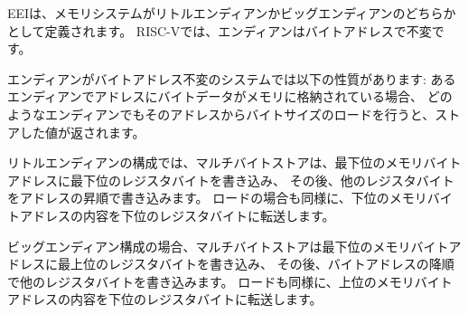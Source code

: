 EEIは、メモリシステムがリトルエンディアンかビッグエンディアンのどちらかとして定義されます。
RISC-Vでは、エンディアンはバイトアドレスで不変です。

\begin{commentary}
\begin{comment}
In a system for which endianness is byte-address invariant, the following
property holds: if a byte is stored to memory at some address in some
endianness, then a byte-sized load from that address in any endianness returns
the stored value.
\end{comment}

エンディアンがバイトアドレス不変のシステムでは以下の性質があります:
あるエンディアンでアドレスにバイトデータがメモリに格納されている場合、
どのようなエンディアンでもそのアドレスからバイトサイズのロードを行うと、ストアした値が返されます。

\begin{comment}
In a little-endian configuration, multibyte stores write the least-significant
register byte at the lowest memory byte address, followed by the other
register bytes in ascending order of their significance.
Loads similarly transfer the contents of the lesser memory byte addresses to
the less-significant register bytes.
\end{comment}

リトルエンディアンの構成では、マルチバイトストアは、最下位のメモリバイトアドレスに最下位のレジスタバイトを書き込み、
その後、他のレジスタバイトをアドレスの昇順で書き込みます。
ロードの場合も同様に、下位のメモリバイトアドレスの内容を下位のレジスタバイトに転送します。

\begin{comment}
In a big-endian configuration, multibyte stores write the most-significant
register byte at the lowest memory byte address, followed by the other
register bytes in descending order of their significance.
Loads similarly transfer the contents of the greater memory byte addresses to
the less-significant register bytes.
\end{comment}

ビッグエンディアン構成の場合、マルチバイトストアは最下位のメモリバイトアドレスに最上位のレジスタバイトを書き込み、
その後、バイトアドレスの降順で他のレジスタバイトを書き込みます。
ロードも同様に、上位のメモリバイトアドレスの内容を下位のレジスタバイトに転送します。

\end{commentary}

